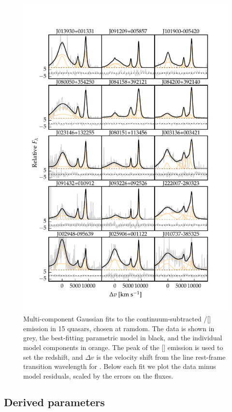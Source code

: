 \begin{figure}
    \centering
    \includegraphics[width=\textwidth]{figures/chapter04/example_spectrum_grid.pdf} 
    \caption{Multi-component Gaussian fits to the continuum-subtracted \hbns/[] emission in 15 quasars, chosen at ramdom. The data is shown in grey, the best-fitting parametric model in black, and the individual model components in orange. The peak of the [] emission is used to set the redshift, and $\Delta{v}$ is the velocity shift from the line rest-frame transition wavelength for \hb. Below each fit we plot the data minus model residuals, scaled by the errors on the fluxes.}     
    \label{fig:example_spectrum_grid}
\end{figure}

\subsection{Derived parameters}

